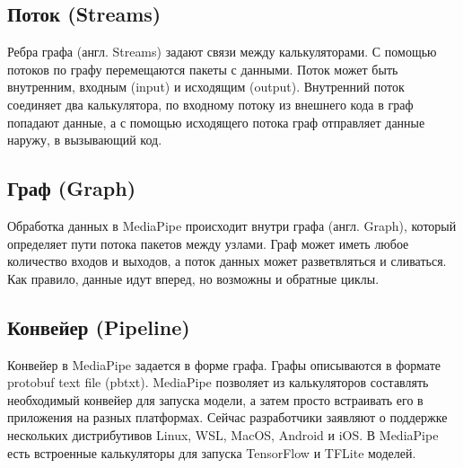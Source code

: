 \documentclass[a4paper,14pt]{extreport}
\begin{document}
            \subsection{Поток (Streams)}
            Ребра графа (англ. Streams) задают связи между калькуляторами. С помощью потоков по графу перемещаются пакеты с данными. Поток может быть внутренним, входным (input) и исходящим (output). Внутренний поток соединяет два калькулятора, по входному потоку из внешнего кода в граф попадают данные, а с помощью исходящего потока граф отправляет данные наружу, в вызывающий код.
    
            \subsection{Граф (Graph)}
            Обработка данных в MediaPipe происходит внутри графа (англ. Graph), который определяет пути потока пакетов между узлами. Граф может иметь любое количество входов и выходов, а поток данных может разветвляться и сливаться. Как правило, данные идут вперед, но возможны и обратные циклы.
    
            \subsection{Конвейер (Pipeline)}
            Конвейер в MediaPipe задается в форме графа. Графы описываются в формате protobuf text file (pbtxt). MediaPipe позволяет из калькуляторов составлять необходимый конвейер для запуска модели, а затем просто встраивать его в приложения на разных платформах. Сейчас разработчики заявляют о поддержке нескольких дистрибутивов Linux, WSL, MacOS, Android и iOS. В MediaPipe есть встроенные калькуляторы для запуска TensorFlow и TFLite моделей.
\end{document}
